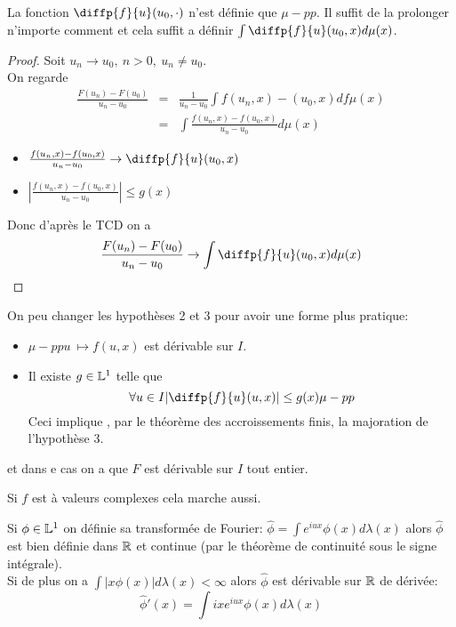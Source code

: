 \begin{remarque}
	La fonction $\diffp{f}{u}(u_0,\cdot)$ n'est définie que $\mu-pp$. Il suffit de
	la prolonger n'importe comment et cela suffit a définir $\int \diffp{f}{u}(u_0,x)d\mu(x)$.
\end{remarque}

\begin{proof}
	Soit $u_n \to u_0, \ n > 0, \ u_n \neq u_0$. \\
	On regarde
	\begin{eqnarray*}
		\frac{F(u_n)-F(u_0)}{u_n-u_0} &=& \frac{1}{u_n-u_0} \int f(u_n,x) -(u_0,x)df\mu(x) \\
		&=& \int \frac{f(u_n,x) - f(u_0,x)}{u_n-u_0}d\mu(x)
	\end{eqnarray*}
	\begin{itemize}
		\item $\frac{f(u_n,x)- f(u_0,x)}{u_n-u_0} \to \diffp{f}{u}(u_0,x)$
		\item $\left|\frac{f(u_n,x)- f(u_0,x)}{u_n-u_0} \right| \leq g(x)$
	\end{itemize}
	Donc d'après le TCD on a %
	$$ \frac{F(u_n)- F(u_0)}{u_n-u_0} \to \int \diffp{f}{u}(u_0,x) d\mu(x)$$

\end{proof}

\begin{remarque}
	On peu changer les hypothèses 2 et 3 pour avoir une forme plus pratique:
	\begin{itemize}
		\item $\mu-pp u \ \mapsto f(u,x)$ est dérivable sur $I$.
		\item Il existe $g\in \mathbb{L}^1$ telle que
		      $$ \forall u\in I |\diffp{f}{u}(u,x)| \leq g(x) \mu-pp$$
		      Ceci implique , par le théorème des accroissements finis, la majoration de l'hypothèse 3.
	\end{itemize}
	et dans e cas on a que $F$ est dérivable sur $I$ tout entier.
\end{remarque}

\begin{remarque}
	Si $f$ est à valeurs complexes cela marche aussi.
\end{remarque}


\begin{example}
	Si $\phi \in \mathbb{L}^1$ on définie sa transformée de Fourier:
	$\hat{\phi} = \int e^{iux}\phi(x) d\lambda(x)$
	alors $\hat{\phi}$ est bien définie dans $\mathbb{R}$ et continue (par le théorème de continuité sous le signe intégrale).\\
	Si de plus on a $\int |x\phi(x)|d\lambda(x)<\infty$ alors $\hat{\phi}$ est dérivable sur $\mathbb{R}$ de dérivée:
	$$\hat{\phi}'(x)= \int ixe^{iux}\phi(x)d\lambda(x)$$
\end{example}




